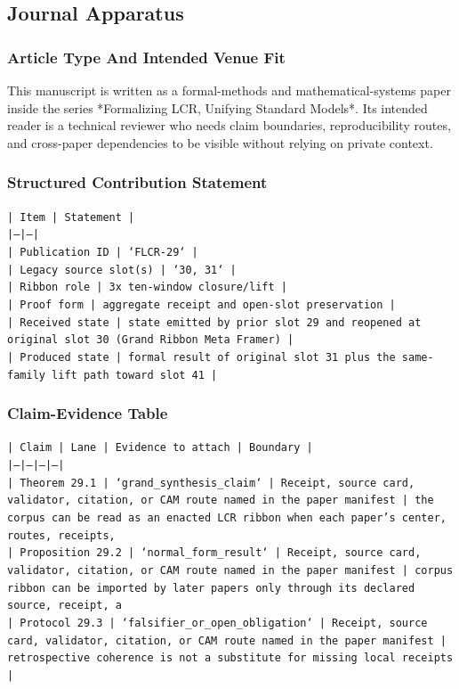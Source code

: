 \documentclass[11pt]{article}
\begin{document}
\subsection*{Journal Apparatus}

\subsubsection*{Article Type And Intended Venue Fit}

This manuscript is written as a formal-methods and mathematical-systems paper
inside the series *Formalizing LCR, Unifying Standard Models*. Its intended
reader is a technical reviewer who needs claim boundaries, reproducibility
routes, and cross-paper dependencies to be visible without relying on private
context.

\subsubsection*{Structured Contribution Statement}

\noindent\texttt{| Item | Statement |}\\
\noindent\texttt{|---|---|}\\
\noindent\texttt{| Publication ID | `FLCR-29` |}\\
\noindent\texttt{| Legacy source slot(s) | `30, 31` |}\\
\noindent\texttt{| Ribbon role | 3x ten-window closure/lift |}\\
\noindent\texttt{| Proof form | aggregate receipt and open-slot preservation |}\\
\noindent\texttt{| Received state | state emitted by prior slot 29 and reopened at original slot 30 (Grand Ribbon Meta Framer) |}\\
\noindent\texttt{| Produced state | formal result of original slot 31 plus the same-family lift path toward slot 41 |}\\

\subsubsection*{Claim-Evidence Table}

\noindent\texttt{| Claim | Lane | Evidence to attach | Boundary |}\\
\noindent\texttt{|---|---|---|---|}\\
\noindent\texttt{| Theorem 29.1 | `grand\_synthesis\_claim` | Receipt, source card, validator, citation, or CAM route named in the paper manifest | the corpus can be read as an enacted LCR ribbon when each paper's center, routes, receipts,}\\
\noindent\texttt{| Proposition 29.2 | `normal\_form\_result` | Receipt, source card, validator, citation, or CAM route named in the paper manifest | corpus ribbon can be imported by later papers only through its declared source, receipt, a}\\
\noindent\texttt{| Protocol 29.3 | `falsifier\_or\_open\_obligation` | Receipt, source card, validator, citation, or CAM route named in the paper manifest | retrospective coherence is not a substitute for missing local receipts |}\\
\end{document}

